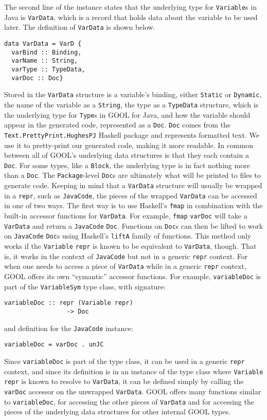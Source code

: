 \documentclass[sigplan,review,anonymous,prologue,dvipsnames]{acmart}
\begin{document}
The second line of the instance states that the underlying type for 
\verb|Variable|s in Java is \verb|VarData|, which is a record that holds data 
about the variable to be used later. The definition of \verb|VarData| is shown 
below.
\begin{lstlisting}
data VarData = VarD {
  varBind :: Binding, 
  varName :: String, 
  varType :: TypeData, 
  varDoc :: Doc}
\end{lstlisting}
Stored in the \verb|VarData| structure is a variable's binding, either 
\verb|Static| or \verb|Dynamic|, the name of the variable as a \verb|String|, 
the type as a \verb|TypeData| structure, which is the underlying type for 
\verb|Type|s in GOOL for Java, and how the variable should appear in the 
generated code, represented as a \verb|Doc|. \verb|Doc| comes from the 
\verb|Text.PrettyPrint.HughesPJ| Haskell package and represents formatted text. 
We use it to pretty-print our generated code, making it more readable.
In common between all of GOOL's underlying data structures is that they each 
contain a \verb|Doc|. For some types, like a \verb|Block|, the underlying type 
is in fact nothing more than a \verb|Doc|. The \verb|Package|-level \verb|Doc|s 
are ultimately what will be printed to files to generate code. Keeping in mind 
that a \verb|VarData| structure will usually be wrapped in a \verb|repr|, such 
as \verb|JavaCode|, the pieces of the wrapped \verb|VarData| can be accessed in 
one of two ways. The first way is to use Haskell's \verb|fmap| in combination 
with the built-in accessor functions for \verb|VarData|. For example, 
\verb|fmap| \verb|varDoc| will take a \verb|VarData| and return a 
\verb|JavaCode| \verb|Doc|. Functions on \verb|Doc|s can then be lifted to work 
on \verb|JavaCode| \verb|Doc|s using Haskell's \verb|liftA| family of 
functions. This method only works if the \verb|Variable| \verb|repr| is known 
to be equivalent to \verb|VarData|, though. That is, it works in the context of 
\verb|JavaCode| but not in a generic \verb|repr| context. For when one needs to 
access a piece of \verb|VarData| while in a generic \verb|repr| context, GOOL 
offers its own ``symantic'' accessor functions. For example, \verb|variableDoc| 
is part of the \verb|VariableSym| type class, with signature:
\begin{lstlisting}
variableDoc :: repr (Variable repr) 
                 -> Doc
\end{lstlisting}
and definition for the \verb|JavaCode| instance:
\begin{lstlisting}
variableDoc = varDoc . unJC
\end{lstlisting}
Since \verb|variableDoc| is part of the type class, it can be used in a generic 
\verb|repr| context, and since its definition is in an instance of the type 
class where \verb|Variable| \verb|repr| is known to resolve to \verb|VarData|, 
it can be defined simply by calling the \verb|varDoc| accessor on the unwrapped 
\verb|VarData|. GOOL offers many functions similar to \verb|variableDoc|, for 
accessing the other pieces of \verb|VarData| and for accessing the pieces of 
the underlying data structures for other internal GOOL types.
\end{document}
